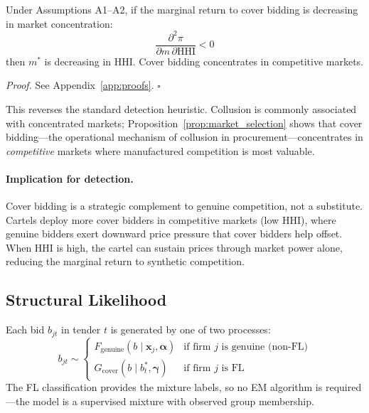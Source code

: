 \begin{proposition}
\label{prop:market_selection}
Under Assumptions A1--A2, if the marginal return to cover bidding is
decreasing in market concentration:
\begin{equation}
  \frac{\partial^2 \pi}{\partial m \, \partial \text{HHI}} < 0
  \label{eq:cross_deriv}
\end{equation}
then $m^*$ is decreasing in HHI. Cover bidding concentrates in
competitive markets.
\end{proposition}

\noindent\emph{Proof.} See Appendix~\ref{app:proofs}. \hfill$\square$

\medskip

This reverses the standard detection heuristic. Collusion is commonly
associated with concentrated markets; Proposition~\ref{prop:market_selection}
shows that cover bidding---the operational mechanism of collusion in
procurement---concentrates in \emph{competitive} markets where
manufactured competition is most valuable.

\paragraph{Implication for detection.}
Cover bidding is a strategic complement to genuine competition, not
a substitute. Cartels deploy more cover bidders in competitive
markets (low HHI), where genuine bidders exert downward price
pressure that cover bidders help offset. When HHI is high, the
cartel can sustain prices through market power alone, reducing the
marginal return to synthetic competition.


\subsection{Structural Likelihood}
\label{sec:likelihood}

Each bid $b_{jt}$ in tender $t$ is generated by one of two processes:
\begin{equation}
  b_{jt} \sim
  \begin{cases}
    F_{\text{genuine}}(b \mid \mathbf{x}_j, \boldsymbol{\alpha}) &
      \text{if firm } j \text{ is genuine (non-FL)} \\
    G_{\text{cover}}(b \mid b^*_t, \boldsymbol{\gamma}) &
      \text{if firm } j \text{ is FL}
  \end{cases}
  \label{eq:mixture}
\end{equation}
The FL classification provides the mixture labels, so no EM algorithm
is required---the model is a supervised mixture with observed group
membership.

